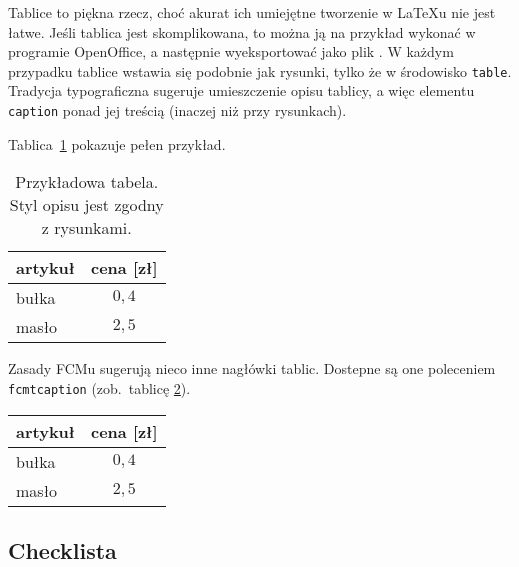 Tablice to piękna rzecz, choć akurat ich umiejętne tworzenie w \LaTeX{}u nie jest łatwe.
Jeśli tablica jest skomplikowana, to można ją na przykład wykonać w programie
OpenOffice, a następnie wyeksportować jako plik . W każdym przypadku tablice wstawia się podobnie
jak rysunki, tylko że w środowisko \texttt{table}. Tradycja typograficzna sugeruje umieszczenie opisu tablicy, a więc
elementu \texttt{caption} ponad jej treścią (inaczej niż przy rysunkach).

Tablica~\ref{tab:tabela} pokazuje pełen przykład.

\begin{table}[ht]
    \caption{Przykładowa tabela. Styl opisu jest zgodny z rysunkami.}\label{tab:tabela}
    \centering\footnotesize%
    \begin{tabular}{l c}
        \toprule
        artykuł & cena [zł] \\
        \midrule
        bułka   & $0,4$ \\
        masło   & $2,5$ \\
        \bottomrule
    \end{tabular}
\end{table}

Zasady FCMu sugerują nieco inne nagłówki tablic. Dostepne są one poleceniem \texttt{fcmtcaption} (zob.~tablicę
\ref{tab:tabela2}).

\begin{table}[ht]
    \label{tab:tabela2}
    \centering\footnotesize%
    \begin{tabular}{l c}
        \toprule
        artykuł & cena [zł] \\
        \midrule
        bułka   & $0,4$ \\
        masło   & $2,5$ \\
        \bottomrule
    \end{tabular}
\end{table}


\subsection{Checklista}

